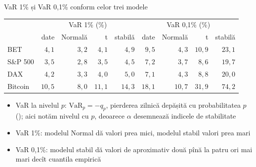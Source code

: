\begin{frame}{VaR 1\% și VaR 0,1\% conform celor trei modele}
\itemsize{\small}
\begin{center}
\footnotesize
\begin{tabular}{l|rrrr|rrrr}
\toprule
& \multicolumn{4}{c|}{VaR 1\% (\%)} & \multicolumn{4}{c}{VaR 0,1\% (\%)} \\ & date & Normală & t & stabilă & date & Normală & t & stabilă \\
\midrule
BET & $4{,}1$ & $3{,}2$ & $4{,}1$ & $4{,}9$ & $9{,}5$ & $4{,}3$ & $10{,}9$ & $23{,}1$ \\
S\&P 500 & $3{,}5$ & $2{,}8$ & $3{,}5$ & $4{,}5$ & $7{,}2$ & $3{,}7$ & $8{,}6$ & $19{,}7$ \\
DAX & $4{,}2$ & $3{,}3$ & $4{,}0$ & $5{,}0$ & $7{,}1$ & $4{,}3$ & $8{,}8$ & $20{,}0$ \\
Bitcoin & $10{,}5$ & $8{,}0$ & $11{,}1$ & $14{,}3$ & $18{,}1$ & $10{,}7$ & $31{,}9$ & $74{,}2$ \\
\bottomrule
\end{tabular}
\end{center}
\begin{itemize}
    \item VaR la nivelul $p$: $\mathrm{VaR}_p = -q_p$, pierderea zilnică depășită cu probabilitatea $p$ (); aici notăm nivelul cu $p$, deoarece $\alpha$ desemnează indicele de stabilitate
    \item VaR 1\%: modelul Normal dă valori prea mici, modelul stabil valori prea mari
    \item VaR 0,1\%: modelul stabil dă valori de aproximativ două pînă la patru ori mai mari decît cuantila empirică
\end{itemize}
\end{frame}

